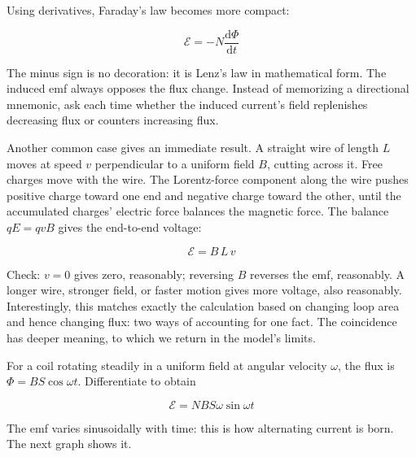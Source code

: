 \begin{mathbridge}
Using derivatives, Faraday's law becomes more compact:

\[
\mathcal{E} = -N\frac{\mathrm{d}\Phi}{\mathrm{d}t}
\]

The minus sign is no decoration: it is Lenz's law in mathematical form. The induced emf always opposes the flux change. Instead of memorizing a directional mnemonic, ask each time whether the induced current's field replenishes decreasing flux or counters increasing flux.

Another common case gives an immediate result. A straight wire of length \(L\) moves at speed \(v\) perpendicular to a uniform field \(B\), cutting across it. Free charges move with the wire. The Lorentz-force component along the wire pushes positive charge toward one end and negative charge toward the other, until the accumulated charges' electric force balances the magnetic force. The balance \(qE=qvB\) gives the end-to-end voltage:

\[
\mathcal{E} = B\,L\,v
\]

Check: \(v=0\) gives zero, reasonably; reversing \(B\) reverses the emf, reasonably. A longer wire, stronger field, or faster motion gives more voltage, also reasonably. Interestingly, this matches exactly the calculation based on changing loop area and hence changing flux: two ways of accounting for one fact. The coincidence has deeper meaning, to which we return in the model's limits.

For a coil rotating steadily in a uniform field at angular velocity \(\omega\), the flux is \(\Phi=BS\cos\omega t\). Differentiate to obtain

\[
\mathcal{E} = NBS\omega\sin\omega t
\]

The emf varies sinusoidally with time: this is how alternating current is born. The next graph shows it.
\end{mathbridge}

\begin{center}
\end{center}

